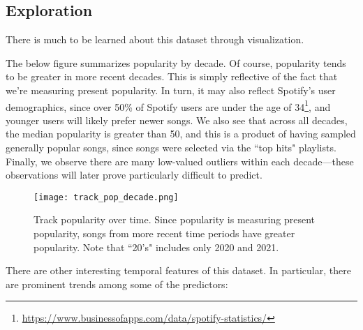 \documentclass[12pt, twoside]{article}
\begin{document}
\subsection{Exploration}
There is much to be learned about this dataset through visualization.

The below figure summarizes popularity by decade. Of course, popularity tends to be greater in more recent decades. This is simply reflective of the fact that we're measuring present popularity. In turn, it may also reflect Spotify's user demographics, since over 50\% of Spotify users are under the age of 34\footnote{\href{https://www.businessofapps.com/data/spotify-statistics/}{https://www.businessofapps.com/data/spotify-statistics/}}, and younger users will likely prefer newer songs. We also see that across all decades, the median popularity is greater than 50, and this is a product of having sampled generally popular songs, since songs were selected via the ``top hits" playlists. Finally, we observe there are many low-valued outliers within each decade---these observations will later prove particularly difficult to predict.

\begin{figure}[H] %
\centering
\texttt{[image: track\_pop\_decade.png]} %
\caption{Track popularity over time. Since popularity is measuring present popularity, songs from more recent time periods have greater popularity. Note that ``20's" includes only 2020 and 2021.}
\label{fig:track_pop_decade} %
\end{figure}

There are other interesting temporal features of this dataset. In particular, there are prominent trends among some of the predictors:
\end{document}
